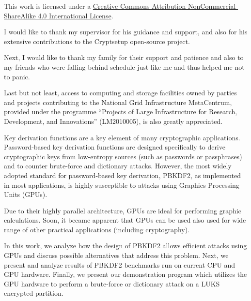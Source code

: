 \documentclass[12pt,oneside]{fithesis2}
\begin{document}
  \FrontMatter                    %
    \ThesisTitlePage                %
    
    This work is licensed under a \href{https://creativecommons.org/licenses/by-nc-sa/4.0/}{Creative Commons Attribution-NonCommercial-ShareAlike 4.0 International License}.
    \begin{center}
      \Large \ccbyncsa
    \end{center}
    
    \begin{ThesisDeclaration}       %
      \DeclarationText
      \AdvisorName
    \end{ThesisDeclaration}
    
    \begin{ThesisThanks}            %
      \sloppy
      I would like to thank my supervisor for his guidance and support, and also for his extensive contributions to the Cryptsetup open-source project.
      
      Next, I would like to thank my family for their support and patience and also to my friends who were falling behind schedule just like me and thus helped me not to panic.
      
      \sloppy
      Last but not least, access to computing and storage facilities owned by parties and projects contributing to the National Grid Infrastructure MetaCentrum, provided under the programme ``Projects of Large Infrastructure for Research, Development, and Innovations'' (LM2010005), is also greatly appreciated.
    \end{ThesisThanks}
    
    \begin{ThesisAbstract}          %
      Key derivation functions are a key element of many cryptographic applications. Password-based key derivation functions are designed specifically to derive cryptographic keys from low-entropy sources (such as passwords or passphrases) and to counter brute-force and dictionary attacks. However, the most widely adopted standard for password-based key derivation, PBKDF2, as implemented in most applications, is highly susceptible to attacks using Graphics Processing Units (GPUs).
      
      Due to their highly parallel architecture, GPUs are ideal for performing graphic calculations. Soon, it became apparent that GPUs can be used also used for wide range of other practical applications (including cryptography).
      
      In this work, we analyze how the design of PBKDF2 allows efficient attacks using GPUs and discuss possible alternatives that address this problem. Next, we present and analyze results of PBKDF2 benchmarks run on current CPU and GPU hardware. Finally, we present our demonstration program which utilizes the GPU hardware to perform a brute-force or dictionary attack on a LUKS encrypted partition.
    \end{ThesisAbstract}
    
\end{document}
